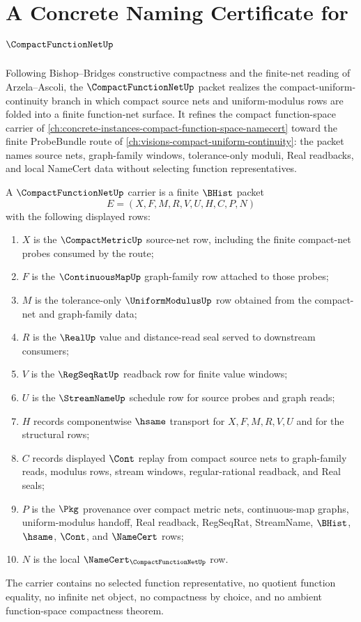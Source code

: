 \chapter{A Concrete Naming Certificate for $\CompactFunctionNetUp$}
\label{ch:concrete-instances-compact-function-net-namecert}

Following Bishop--Bridges constructive compactness and the finite-net reading of Arzela--Ascoli, the $\CompactFunctionNetUp$ packet realizes the compact-uniform-continuity branch in which compact source nets and uniform-modulus rows are folded into a finite function-net surface. It refines the compact function-space carrier of \autoref{ch:concrete-instances-compact-function-space-namecert} toward the finite ProbeBundle route of \autoref{ch:visions-compact-uniform-continuity}: the packet names source nets, graph-family windows, tolerance-only moduli, Real readbacks, and local NameCert data without selecting function representatives.

\begin{definition}
\label{def:compact-function-net-carrier}
A $\CompactFunctionNetUp$ carrier is a finite $\BHist$ packet
$$
E=(X,F,M,R,V,U,H,C,P,N)
$$
with the following displayed rows:
\begin{enumerate}
\item $X$ is the $\CompactMetricUp$ source-net row, including the finite compact-net probes consumed by the route;
\item $F$ is the $\ContinuousMapUp$ graph-family row attached to those probes;
\item $M$ is the tolerance-only $\UniformModulusUp$ row obtained from the compact-net and graph-family data;
\item $R$ is the $\RealUp$ value and distance-read seal served to downstream consumers;
\item $V$ is the $\RegSeqRatUp$ readback row for finite value windows;
\item $U$ is the $\StreamNameUp$ schedule row for source probes and graph reads;
\item $H$ records componentwise $\hsame$ transport for $X,F,M,R,V,U$ and for the structural rows;
\item $C$ records displayed $\Cont$ replay from compact source nets to graph-family reads, modulus rows, stream windows, regular-rational readback, and Real seals;
\item $P$ is the $\Pkg$ provenance over compact metric nets, continuous-map graphs, uniform-modulus handoff, Real readback, RegSeqRat, StreamName, $\BHist$, $\hsame$, $\Cont$, and $\NameCert$ rows;
\item $N$ is the local $\NameCert_{\CompactFunctionNetUp}$ row.
\end{enumerate}
The carrier contains no selected function representative, no quotient function equality, no infinite net object, no compactness by choice, and no ambient function-space compactness theorem.
\end{definition}

